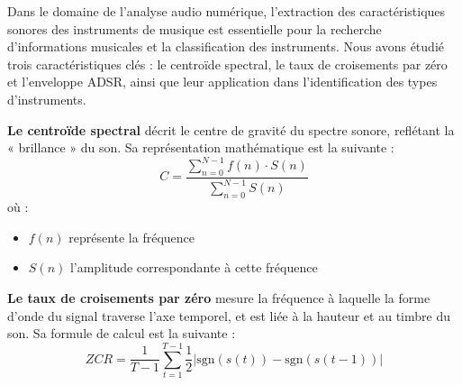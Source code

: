Dans le domaine de l'analyse audio numérique, l'extraction des caractéristiques sonores des instruments de musique est essentielle pour la recherche d'informations musicales et la classification des instruments. Nous avons étudié trois caractéristiques clés : le centroïde spectral, le taux de croisements par zéro et l'enveloppe ADSR, ainsi que leur application dans l'identification des types d'instruments.

\textbf{Le centroïde spectral} décrit le centre de gravité du spectre sonore, reflétant la « brillance » du son. Sa représentation mathématique est la suivante : 
\begin{equation}
    C = \frac{\sum_{n=0}^{N-1}f(n)\cdot S(n)}{\sum_{n=0}^{N-1}S(n)}
\end{equation}
où :
\begin{itemize}
    \item \(f(n)\) représente la fréquence
    \item \(S(n)\) l'amplitude correspondante à cette fréquence
\end{itemize}

\textbf{Le taux de croisements par zéro} mesure la fréquence à laquelle la forme d'onde du signal traverse l'axe temporel, et est liée à la hauteur et au timbre du son. Sa formule de calcul est la suivante :
\begin{equation}
    ZCR = \frac{1}{T-1}\sum_{t=1}^{T-1}\frac{1}{2}|\text{sgn}(s(t))-\text{sgn}(s(t-1))|
\end{equation}

